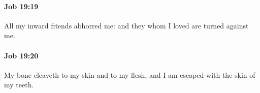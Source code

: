		\paragraph{Job 19:19} %
			\label{JOB-19-19}

			All my inward friends abhorred me: and they whom I loved are turned against me.


		\paragraph{Job 19:20} %
			\label{JOB-19-20}

			My bone cleaveth to my skin and to my flesh, and I am escaped with the skin of my teeth.


